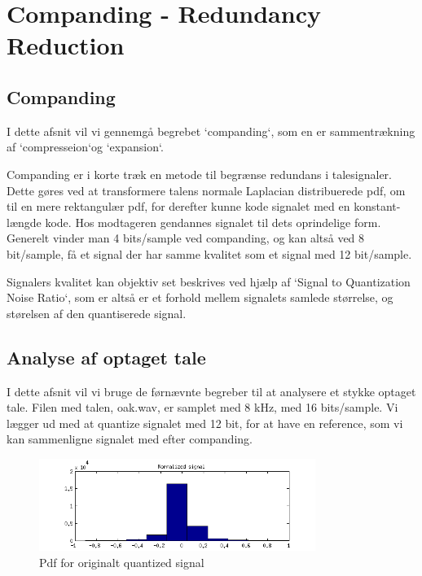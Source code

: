 \chapter{Companding - Redundancy Reduction}
\label{ch:part1}

\section{Companding}

I dette afsnit vil vi gennemgå begrebet `companding`, som en er sammentrækning af `compresseion`og `expansion`. 

Companding er i korte træk en metode til begrænse redundans i talesignaler. Dette gøres ved at transformere talens normale Laplacian distribuerede pdf, om til en mere rektangulær pdf, for derefter kunne kode signalet med en konstant-længde kode. Hos modtageren gendannes signalet til dets oprindelige form. Generelt vinder man 4 bits/sample ved companding, og kan altså ved 8 bit/sample, få et signal der har samme kvalitet som et signal med 12 bit/sample. 

Signalers kvalitet kan objektiv set beskrives ved hjælp af `Signal to Quantization Noise Ratio`, som er altså er et forhold mellem signalets samlede størrelse, og størelsen af den quantiserede signal. 

\section{Analyse af optaget tale}

I dette afsnit vil vi bruge de førnævnte begreber til at analysere et stykke optaget tale. Filen med talen, oak.wav, er samplet med 8 kHz, med 16 bits/sample. Vi lægger ud med at quantize signalet med 12 bit, for at have en reference, som vi kan sammenligne signalet med efter companding. 

 \begin{figure}[!ht]
 	\centering
 	\includegraphics[width=0.8\textwidth]{resources/part1_original}
 	\caption{Pdf for originalt quantized signal}
 	\label{fig:part1_1}
 \end{figure}

